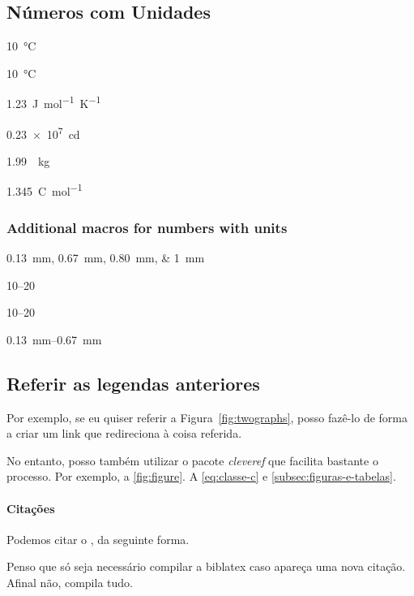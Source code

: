     \subsection*{Números com Unidades}

    \qty{10}{\celsius} \par
    \qty{10}{\degreeCelsius} \par
    \qty{1.23}{J.mol^{-1}.K^{-1}} \par
    \qty{.23e7}{\candela} \par
    \qty[per-mode = symbol]{1.99}{\per\kilogram} \par
    \qty[per-mode = fraction]{1,345}{\coulomb\per\mole}

    \pagebreak

    \subsubsection*{Additional macros for numbers with units}

    \qtylist{0.13;0.67;0.80;1}{\milli\metre}\par
     \par
     \par
    \numrange{10}{20} \par
    \numrange[range-phrase=--]{10}{20} \par
    \qtyrange{0.13}{0.67}{\milli\metre}

    \subsection{Referir as legendas anteriores}\label{subsec:reference}

    Por exemplo, se eu quiser referir a Figura~\ref{fig:twographs}, posso fazê-lo de forma a criar um link que redireciona à coisa referida.

    No entanto, posso também utilizar o pacote \emph{cleveref} que facilita bastante o processo.
    Por exemplo, a \cref{fig:figure}.
    A \cref{eq:classe-c} e \cref{subsec:figuras-e-tabelas}.

\paragraph{Citações} Podemos citar o \textcite{einstein}, da seguinte forma.

Penso que só seja necessário compilar a biblatex caso apareça uma nova citação.
Afinal não, compila tudo.

